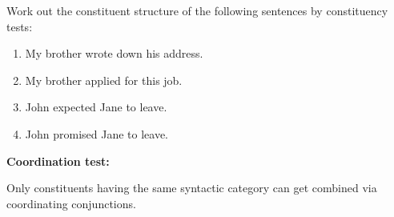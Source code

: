 \documentclass[11pt]{article}
\begin{document}
{\begin{uexercise}
Work out the constituent structure of the following sentences by
constituency tests:
\begin{enumerate}
\item My brother wrote down his address.
\item My brother applied for this job.
\item John expected Jane to leave.
\item John promised Jane to leave. 
\end{enumerate}
\end{uexercise}

\item[] {\bf Coordination test:}

\item[] Only constituents having the same syntactic category can get combined via coordinating conjunctions.
}

% 




\end{document}
